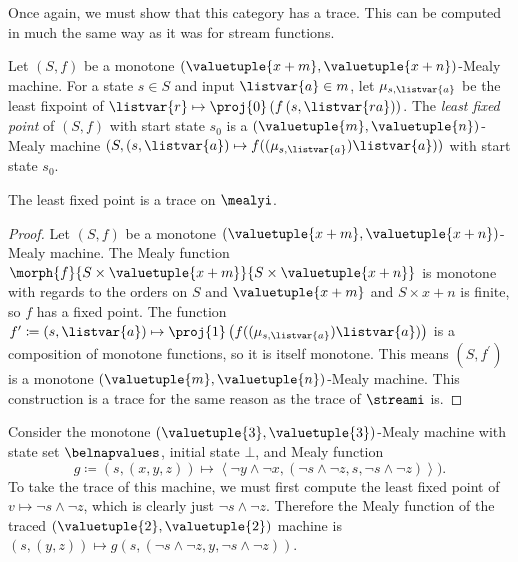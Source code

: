 Once again, we must show that this category has a trace.
This can be computed in much the same way as it was for stream functions.

\begin{definition}
    Let \((S, f)\) be a monotone \(
    (\valuetuple{x+m}, \valuetuple{x+n})
    \)-Mealy machine.
    For a state \(s \in S\) and input \(\listvar{a} \in m\), let
    \(\mu_{s,\listvar{a}}\) be the least fixpoint of \(
    \listvar{r} \mapsto \proj{0}\left(f\left(s, \listvar{ra}\right)\right)
    \).
    The \emph{least fixed point} of \((S, f)\) with start state \(s_0\) is a \(
    (\valuetuple{m}, \valuetuple{n})
    \)-Mealy machine \(
    (S, (s, \listvar{a}) \mapsto f((\mu_{s,\listvar{a}})\listvar{a}))
    \) with start state \(s_0\).
\end{definition}

\begin{proposition}
    The least fixed point is a trace on \(\mealyi\).
\end{proposition}
\begin{proof}
    Let \((S, f)\) be a monotone
    \((\valuetuple{x+m}, \valuetuple{x+n})\)-Mealy machine.
    The Mealy function \(
    \morph{f}{
        S \times \valuetuple{x+m}
    }{
        S \times \valuetuple{x+n}
    }
    \) is monotone with regards to the orders on \(S\) and
    \(\valuetuple{x+m}\) and \(S \times x+n\) is finite, so
    \(f\) has a fixed point.
    The function \(
    f^\prime \coloneqq (s, \listvar{a})
    \mapsto
    \proj{1}\left(f((\mu_{s,\listvar{a}})\listvar{a})\right)
    \) is a composition of monotone functions, so it is itself monotone.
    This means \((S, f^\prime)\) is a monotone \(
    (\valuetuple{m}, \valuetuple{n})
    \)-Mealy machine.
    This construction is a trace for the same reason as the trace of
    \(\streami\) is.
\end{proof}

\begin{example}\label{ex:trace-mealy}
    Consider the monotone \((\valuetuple{3},\valuetuple{3})\)-Mealy machine with
    state set \(\belnapvalues\), initial state \(\bot\), and Mealy function \[
        g \coloneqq (s, (x, y, z))
        \mapsto \left\langle \neg y \land \neg x,
        \left(\neg s \land \neg z, s, \neg s \land \neg z\right)
        \right\rangle
        ).\]
    To take the trace of this machine, we must first compute the least fixed
    point of \(v \mapsto \neg s \land \neg z\), which is clearly just
    \(\neg s \land \neg z\).
    Therefore the Mealy function of the traced
    \((\valuetuple{2}, \valuetuple{2})\) machine is \(
    (s, (y, z)) \mapsto g(s, (\neg s \land \neg z, y, \neg s \land \neg z))
    \).
\end{example}

